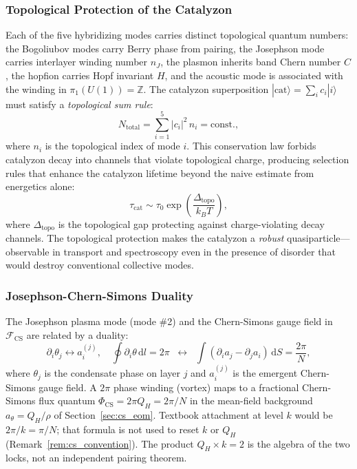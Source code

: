 \documentclass[11pt,letterpaper]{article}
\begin{document}
\subsubsection{Topological Protection of the Catalyzon}

Each of the five hybridizing modes carries distinct topological quantum numbers: the Bogoliubov modes carry Berry phase from pairing, the Josephson mode carries interlayer winding number $n_J$, the plasmon inherits band Chern number $C$, the hopfion carries Hopf invariant $H$, and the acoustic mode is associated with the winding in $\pi_1(U(1)) = \mathbb{Z}$. The catalyzon superposition $|\text{cat}\rangle = \sum_i c_i |i\rangle$ must satisfy a \textit{topological sum rule}:
\begin{equation}
N_{\text{total}} = \sum_{i=1}^5 |c_i|^2 \, n_i = \text{const.},
\end{equation}
where $n_i$ is the topological index of mode $i$. This conservation law forbids catalyzon decay into channels that violate topological charge, producing selection rules that enhance the catalyzon lifetime beyond the naive estimate from energetics alone:
\begin{equation}
\tau_{\text{cat}} \sim \tau_0 \exp\left(\frac{\Delta_{\text{topo}}}{k_B T}\right),
\end{equation}
where $\Delta_{\text{topo}}$ is the topological gap protecting against charge-violating decay channels. The topological protection makes the catalyzon a \textit{robust} quasiparticle---observable in transport and spectroscopy even in the presence of disorder that would destroy conventional collective modes.

\subsubsection{Josephson-Chern-Simons Duality}

The Josephson plasma mode (mode \#2) and the Chern-Simons gauge field in $\mathcal{F}_{\text{CS}}$ are related by a duality:
\begin{equation}
\partial_i \theta_j \longleftrightarrow a_i^{(j)}, \quad \oint \partial_i \theta \, \mathrm{d}l = 2\pi \;\; \longleftrightarrow \;\; \int (\partial_i a_j - \partial_j a_i) \, \mathrm{d}S = \frac{2\pi}{N},
\end{equation}
where $\theta_j$ is the condensate phase on layer $j$ and $a_i^{(j)}$ is the emergent Chern-Simons gauge field. A $2\pi$ phase winding (vortex) maps to a fractional Chern-Simons flux quantum $\Phi_{\text{CS}} = 2\pi Q_H = 2\pi/N$ in the mean-field background $a_\theta=Q_H/\rho$ of Section~\ref{sec:cs_eom}. Textbook attachment at level $k$ would be $2\pi/k=\pi/N$; that formula is not used to reset $k$ or $Q_H$ (Remark~\ref{rem:cs_convention}). The product $Q_H \times k = 2$ is the algebra of the two locks, not an independent pairing theorem.
\end{document}

